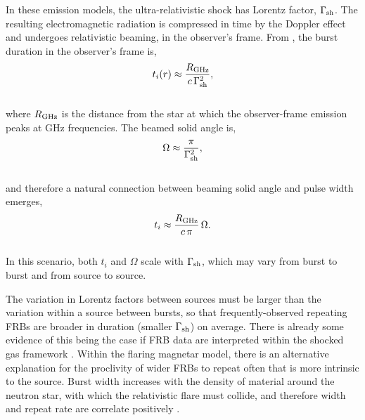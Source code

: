 \documentclass[fleqn,usenatbib]{mnras}
\begin{document}
In these emission models, the ultra-relativistic shock 
has Lorentz factor, $\Gamma_{\rm sh}$. The resulting electromagnetic 
radiation is compressed in time by the Doppler effect and 
undergoes relativistic beaming, in the observer's frame. From \citet{beloborodov-2019}, the burst duration in the observer's frame is,
\\
\begin{equation}
    t_i(r) \approx \frac{R_{\rm GHz}}{c\,\Gamma_{\rm sh}^2},
\end{equation}
\\
\noindent where $R_{\rm GHz}$ is the distance from the 
star at which the observer-frame emission peaks at 
GHz frequencies. The beamed solid angle is,
\\
\begin{equation}
    \Omega \approx \frac{\pi}{\Gamma_{\rm sh}^2},
\end{equation}
\\
\noindent and therefore a natural connection between 
beaming solid angle and pulse width emerges,
\\
\begin{equation}
    t_i \approx \frac{R_{\rm GHz}}{c\,\pi}\,\Omega.
\end{equation}
\\
\noindent In this scenario, both $t_i$ and 
$\Omega$ scale with $\Gamma_{\rm sh}$, which 
may vary from burst to burst and from 
source to source. 

The variation in Lorentz factors between sources 
must be larger than the variation within a source 
between bursts, so that frequently-observed repeating 
FRBs are broader in duration (smaller $\Gamma_{\rm sh}$) on average.
There is already some evidence of this being the case if FRB data 
are interpreted within the shocked gas framework \citep[see Fig. 3]{margalit-2020a}. Within the flaring magnetar model, 
there is an alternative explanation for the 
proclivity of wider FRBs to repeat often that is more
intrinsic to the source. Burst width 
increases with the density of material around the neutron star, 
with which the relativistic flare must collide, and therefore 
width and repeat rate are correlate positively \citep{margalit-2020a}.
\end{document}
